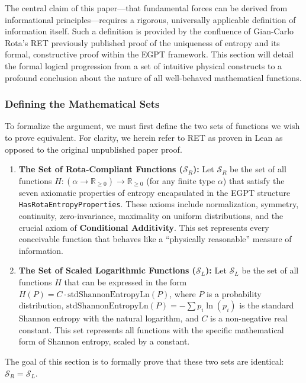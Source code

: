 \documentclass[11pt, letterpaper]{article}
\begin{document}
The central claim of this paper—that fundamental forces can be derived from informational principles—requires a rigorous, universally applicable definition of information itself. Such a definition is provided by the confluence of Gian-Carlo Rota's RET previously published proof of the uniqueness of entropy \cite{RotaProb} and its formal, constructive proof within the EGPT framework. This section will detail the formal logical progression from a set of intuitive physical constructs to a profound conclusion about the nature of all well-behaved mathematical functions.

\subsubsection{Defining the Mathematical Sets}

To formalize the argument, we must first define the two sets of functions we wish to prove equivalent. For clarity, we herein refer to RET as proven in Lean as opposed to the original unpublished paper proof.

\begin{enumerate}
    \item \textbf{The Set of Rota-Compliant Functions ($\mathcal{S}_R$):} Let $\mathcal{S}_R$ be the set of all functions $H: (\alpha \to \mathbb{R}_{\ge 0}) \to \mathbb{R}_{\ge 0}$ (for any finite type $\alpha$) that satisfy the seven axiomatic properties of entropy encapsulated in the EGPT structure \texttt{HasRotaEntropyProperties}. These axioms include normalization, symmetry, continuity, zero-invariance, maximality on uniform distributions, and the crucial axiom of \textbf{Conditional Additivity}. This set represents every conceivable function that behaves like a ``physically reasonable'' measure of information.

    \item \textbf{The Set of Scaled Logarithmic Functions ($\mathcal{S}_L$):} Let $\mathcal{S}_L$ be the set of all functions $H$ that can be expressed in the form $H(P) = C \cdot \text{stdShannonEntropyLn}(P)$, where $P$ is a probability distribution, $\text{stdShannonEntropyLn}(P) = -\sum p_i \ln(p_i)$ is the standard Shannon entropy with the natural logarithm, and $C$ is a non-negative real constant. This set represents all functions with the specific mathematical form of Shannon entropy, scaled by a constant.
\end{enumerate}

The goal of this section is to formally prove that these two sets are identical: $\mathcal{S}_R = \mathcal{S}_L$.
\end{document}
